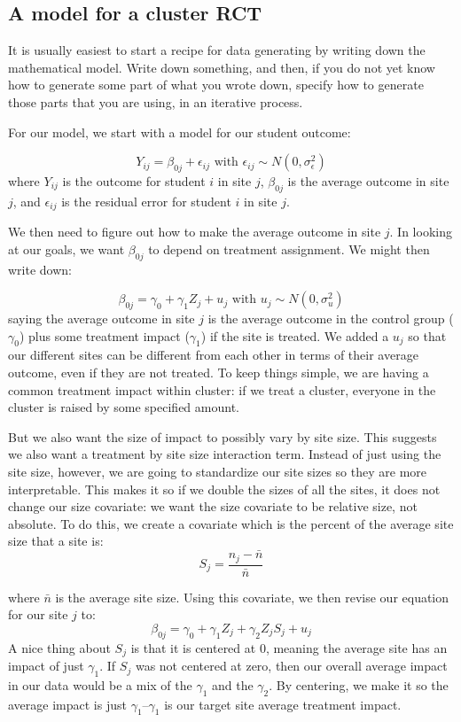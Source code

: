 \documentclass[
]{book}
\begin{document}
\subsection{A model for a cluster RCT}\label{a-model-for-a-cluster-rct}

It is usually easiest to start a recipe for data generating by writing down the mathematical model.
Write down something, and then, if you do not yet know how to generate some part of what you wrote down, specify how to generate those parts that you are using, in an iterative process.

For our model, we start with a model for our student outcome:

\[ Y_{ij} = \beta_{0j} + \epsilon_{ij} \mbox{ with } \epsilon_{ij} \sim N( 0, \sigma^2_\epsilon ) \]
where \(Y_{ij}\) is the outcome for student \(i\) in site \(j\), \(\beta_{0j}\) is the average outcome in site \(j\), and \(\epsilon_{ij}\) is the residual error for student \(i\) in site \(j\).

We then need to figure out how to make the average outcome in site \(j\).
In looking at our goals, we want \(\beta_{0j}\) to depend on treatment assignment.
We might then write down:

\[ \beta_{0j} = \gamma_0 + \gamma_1 Z_j + u_j \mbox{ with } u_j \sim N( 0, \sigma^2_u )\]
saying the average outcome in site \(j\) is the average outcome in the control group (\(\gamma_0\)) plus some treatment impact (\(\gamma_1\)) if the site is treated.
We added a \(u_j\) so that our different sites can be different from each other in terms of their average outcome, even if they are not treated.
To keep things simple, we are having a common treatment impact within cluster: if we treat a cluster, everyone in the cluster is raised by some specified amount.

But we also want the size of impact to possibly vary by site size.
This suggests we also want a treatment by site size interaction term.
Instead of just using the site size, however, we are going to standardize our site sizes so they are more interpretable.
This makes it so if we double the sizes of all the sites, it does not change our size covariate: we want the size covariate to be relative size, not absolute.
To do this, we create a covariate which is the percent of the average site size that a site is:
\[ S_j = \frac{n_j - \bar{n}}{ \bar{n} } \]

where \(\bar{n}\) is the average site size. Using this covariate, we then revise our equation for our site \(j\) to:
\[ \beta_{0j} = \gamma_{0} + \gamma_{1} Z_j + \gamma_2 Z_j S_j + u_j \]
A nice thing about \(S_j\) is that it is centered at 0, meaning the average site has an impact of just \(\gamma_1\).
If \(S_j\) was not centered at zero, then our overall average impact in our data would be a mix of the \(\gamma_1\) and the \(\gamma_2\).
By centering, we make it so the average impact is just \(\gamma_1\)--\(\gamma_1\) is our target site average treatment impact.
\end{document}
